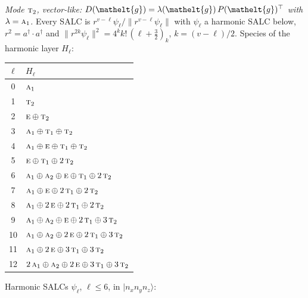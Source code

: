 \documentclass[11pt]{article}
\newcommand{\eltfont}[1]{{\let\sigma\eltsigma\mathelt{#1}}}
\newcommand{\irr}[1]{\text{\normalfont\scshape #1}}
\newcommand{\elt}[1]{\eltfont{#1}}
\newcommand{\occ}[1]{\lvert #1\rangle}
\newcommand{\gel}{\elt{g}}             %
\newcommand{\gmat}{P(\gel)^{\top}}     %
\begin{document}
\emph{Mode $\irr{t}_{2}$, vector-like: $D(\gel)=\lambda(\gel)\,\gmat$ with $\lambda=\irr{a}_{1}$.} Every SALC is $r^{v-\ell}\psi_\ell/\lVert r^{v-\ell}\psi_\ell\rVert$ with $\psi_\ell$ a harmonic SALC below, $r^2=a^\dagger\!\cdot a^\dagger$ and $\lVert r^{2k}\psi_\ell\rVert^2=4^kk!\,(\ell+\tfrac32)_k$, $k=(v-\ell)/2$. Species of the harmonic layer $H_\ell$:
\begin{longtable}{c l}\hline $\ell$ & $H_\ell$\\ \hline\endhead
0 & $\irr{a}_{1}$\\
1 & $\irr{t}_{2}$\\
2 & $\irr{e}\oplus \irr{t}_{2}$\\
3 & $\irr{a}_{1}\oplus \irr{t}_{1}\oplus \irr{t}_{2}$\\
4 & $\irr{a}_{1}\oplus \irr{e}\oplus \irr{t}_{1}\oplus \irr{t}_{2}$\\
5 & $\irr{e}\oplus \irr{t}_{1}\oplus 2\,\irr{t}_{2}$\\
6 & $\irr{a}_{1}\oplus \irr{a}_{2}\oplus \irr{e}\oplus \irr{t}_{1}\oplus 2\,\irr{t}_{2}$\\
7 & $\irr{a}_{1}\oplus \irr{e}\oplus 2\,\irr{t}_{1}\oplus 2\,\irr{t}_{2}$\\
8 & $\irr{a}_{1}\oplus 2\,\irr{e}\oplus 2\,\irr{t}_{1}\oplus 2\,\irr{t}_{2}$\\
9 & $\irr{a}_{1}\oplus \irr{a}_{2}\oplus \irr{e}\oplus 2\,\irr{t}_{1}\oplus 3\,\irr{t}_{2}$\\
10 & $\irr{a}_{1}\oplus \irr{a}_{2}\oplus 2\,\irr{e}\oplus 2\,\irr{t}_{1}\oplus 3\,\irr{t}_{2}$\\
11 & $\irr{a}_{1}\oplus 2\,\irr{e}\oplus 3\,\irr{t}_{1}\oplus 3\,\irr{t}_{2}$\\
12 & $2\,\irr{a}_{1}\oplus \irr{a}_{2}\oplus 2\,\irr{e}\oplus 3\,\irr{t}_{1}\oplus 3\,\irr{t}_{2}$\\
\hline\end{longtable}
Harmonic SALCs $\psi_\ell$, $\ell\le6$, in $\occ{n_xn_yn_z}$:
\end{document}
